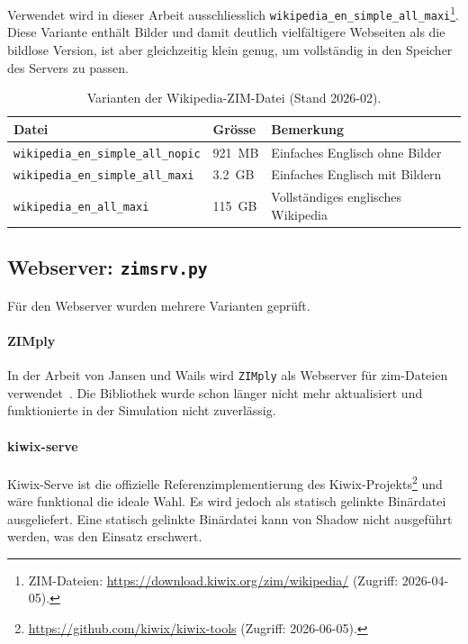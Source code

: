 Verwendet wird in dieser Arbeit ausschliesslich \texttt{wikipedia\_en\_simple\_all\_maxi}\footnote{ZIM-Dateien: \url{https://download.kiwix.org/zim/wikipedia/} (Zugriff: 2026-04-05).}.
Diese Variante enthält Bilder und damit deutlich vielfältigere Webseiten als die bildlose Version, ist aber gleichzeitig klein genug, um vollständig in den Speicher des Servers zu passen.

\begin{table}[H]
\centering
\caption{Varianten der Wikipedia-ZIM-Datei (Stand 2026-02).}
\label{tab:zim_varianten}
\begin{tabular}{lll}
\hline
Datei & Grösse & Bemerkung \\
\hline
\texttt{wikipedia\_en\_simple\_all\_nopic} & 921~MB & Einfaches Englisch ohne Bilder \\
\texttt{wikipedia\_en\_simple\_all\_maxi} & 3.2~GB & Einfaches Englisch mit Bildern \\
\texttt{wikipedia\_en\_all\_maxi} & 115~GB & Vollständiges englisches Wikipedia \\
\hline
\end{tabular}
\end{table}

\subsection{Webserver: \texttt{zimsrv.py}}
\label{sec:realisierung_zimsrv}

Für den Webserver wurden mehrere Varianten geprüft.

\paragraph{ZIMply}
In der Arbeit von Jansen und Wails wird \texttt{ZIMply} als Webserver für \gls{zim}-Dateien verwendet~\cite{jansen2023data}.
Die Bibliothek wurde schon länger nicht mehr aktualisiert und funktionierte in der Simulation nicht zuverlässig.

\paragraph{kiwix-serve}
Kiwix-Serve ist die offizielle Referenzimplementierung des Kiwix-Projekts\footnote{\url{https://github.com/kiwix/kiwix-tools} (Zugriff: 2026-06-05).} und wäre funktional die ideale Wahl.
Es wird jedoch als statisch gelinkte Binärdatei ausgeliefert.
Eine statisch gelinkte Binärdatei kann von Shadow nicht ausgeführt werden, was den Einsatz erschwert.

